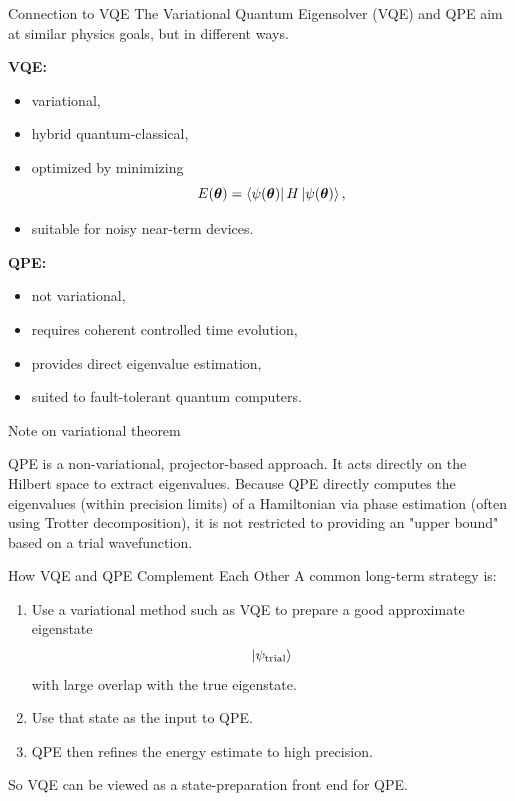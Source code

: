 \documentclass{beamer}
\begin{document}
\begin{frame}{Connection to VQE}
The Variational Quantum Eigensolver (VQE) and QPE aim at similar physics goals, but in different ways.

\textbf{VQE:}
\begin{itemize}
\item variational,
\item hybrid quantum-classical,
\item optimized by minimizing
\[
E(\bm{\theta}) = \bra{\psi(\bm{\theta})} H \ket{\psi(\bm{\theta})},
\]
\item suitable for noisy near-term devices.
\end{itemize}

\textbf{QPE:}
\begin{itemize}
\item not variational,
\item requires coherent controlled time evolution,
\item provides direct eigenvalue estimation,
\item suited to fault-tolerant quantum computers.
\end{itemize}
\end{frame}

\begin{frame}{Note on variational theorem}

QPE is a non-variational, projector-based approach. It acts directly
on the Hilbert space to extract eigenvalues.  Because QPE directly
computes the eigenvalues (within precision limits) of a Hamiltonian
via phase estimation (often using Trotter decomposition), it is not
restricted to providing an "upper bound" based on a trial
wavefunction.
\end{frame}

\begin{frame}{How VQE and QPE Complement Each Other}
A common long-term strategy is:
\begin{enumerate}
\item Use a variational method such as VQE to prepare a good approximate eigenstate
\[
\ket{\psi_{\mathrm{trial}}}
\]
with large overlap with the true eigenstate.

\item Use that state as the input to QPE.

\item QPE then refines the energy estimate to high precision.
\end{enumerate}

So VQE can be viewed as a state-preparation front end for QPE.
\end{frame}
\end{document}
